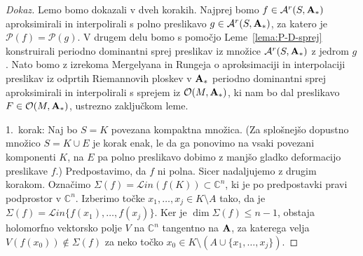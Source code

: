 \documentclass[12pt,a4paper,twoside]{article}
\theoremstyle{definition} %
\newenvironment{dokaz}[1][Dokaz]{\begin{proof}[#1]}{\end{proof}}
\theoremstyle{plain} %
\numberwithin{equation}{section}  %
\begin{document}
\begin{dokaz}
Lemo bomo dokazali v dveh korakih. Najprej bomo $f \in \mathcal{A}^{r}(S, \textbf{\textup{A}}_{*})$ aproksimirali in interpolirali s polno preslikavo $g \in \mathcal{A}^{r}(S, \textbf{\textup{A}}_{*})$, za katero je $\mathcal{P}(f) = \mathcal{P}(g)$.
V drugem delu bomo s pomočjo Leme~\ref{lema:P-D-sprej} konstruirali periodno dominantni sprej preslikav iz množice $\mathcal{A}^{r}(S, \textbf{\textup{A}}_{*})$ z jedrom $g$. Nato bomo z izrekoma Mergelyana in Rungeja o aproksimaciji in interpolaciji preslikav iz odprtih Riemannovih ploskev v $\textbf{\textup{A}}_{*}$ periodno dominantni sprej aproksimirali in interpolirali s sprejem iz $\mathcal{O}(M, \textbf{\textup{A}}_{*})$, ki nam bo dal preslikavo $F   \in \mathcal{O}(M, \textbf{\textup{A}}_{*})$, ustrezno zaključkom leme. \newline

1.~korak: Naj bo $S = K$ povezana kompaktna množica. (Za splošnejšo dopustno množico $S = K \cup E$ je korak enak, le da ga ponovimo na vsaki povezani komponenti $K$, na $E$ pa polno preslikavo dobimo z manjšo gladko deformacijo preslikave $f$.)
Predpostavimo, da $f$ ni polna. Sicer nadaljujemo z drugim korakom.
Označimo $\Sigma(f) = \mathcal{L}in (f(K)) \subset \mathbb{C}^{n}$, ki je po predpostavki pravi podprostor v $\mathbb{C}^{n}$.
Izberimo točke $x_{1}, \dots , x_{j} \in K \setminus A$ tako, da je $\Sigma(f) = \mathcal{L}in \{ f(x_{1}), \dots , f(x_{j}) \}$.
Ker je $\dim \Sigma(f) \leq n-1$, obstaja holomorfno vektorsko polje $V$ na $\mathbb{C}^{n}$ tangentno na $\textbf{\textup{A}}$, za katerega velja $V(f(x_0)) \notin \Sigma(f)$ za neko točko $x_0 \in K \setminus (A \cup \{ x_{1}, \dots , x_{j} \})$.


\end{dokaz}
\end{document}
